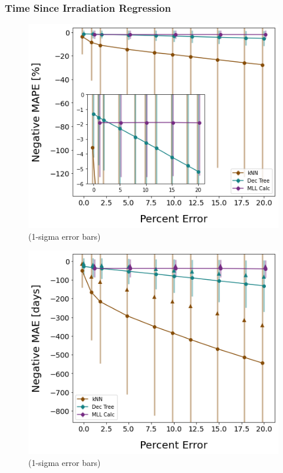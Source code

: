 \begin{frame}
  \frametitle{Time Since Irradiation Regression}
  \begin{adjustwidth}{-15pt}{-5pt}
  \begin{minipage}{0.5\textwidth}
    \begin{figure}
      \centering
      \includegraphics[width=\textwidth]{./figures/randerr_compare_nuc29_MAPE_cool.png}
      \scriptsize (1-sigma error bars)
    \end{figure}
  \end{minipage}%
  \hfill
  \begin{minipage}{0.5\textwidth}
    \begin{figure}
      \centering
      \includegraphics[width=1.05\textwidth]{./figures/randerr_compare_nuc29_MAE_cool.png}
      \scriptsize (1-sigma error bars)
    \end{figure}
  \end{minipage}
  \end{adjustwidth}
\end{frame}

